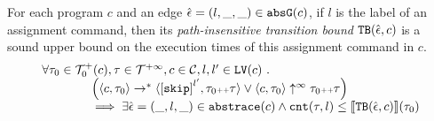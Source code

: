   \begin{theorem}
  For each program ${c}$ and an edge $\hat{\mathtt{\epsilon}{}} = (l, \_, \_) \in \mathtt{abs}{\mathtt{G}}(c)$, if $l$ is the label of an assignment command,
  then its \emph{path-insensitive transition bound} ${\mathtt{TB}}(\hat{\mathtt{\epsilon}{}}, c)$ 
   is a sound upper bound on 
  the execution times of this assignment command in $c$.
    \[
      \begin{array}{l}
        \forall \trace_0 \in \ftdom_0(c), \trace \in \tdom, c \in \cdom, l, l' \in \lvar(c) \sthat
        \\ \qquad \qquad
        \Big( \config{c, \trace_0} \rightarrow^{*} \config{\clabel{\eskip}^{l'}, \trace_0 \tracecat \trace} 
          \lor  \config{c, \trace_0} \uparrow^{\infty} \trace_0 \tracecat \trace \Big)
         \\ \qquad \qquad
         \implies
         \exists \absevent = (\_, l, \_) \in \absflow(c) \land
        \counter(\trace, l) \leq \econfig{\absclr(\absevent, c)}(\trace_0)
      \end{array}
    \]
  \end{theorem}
%
